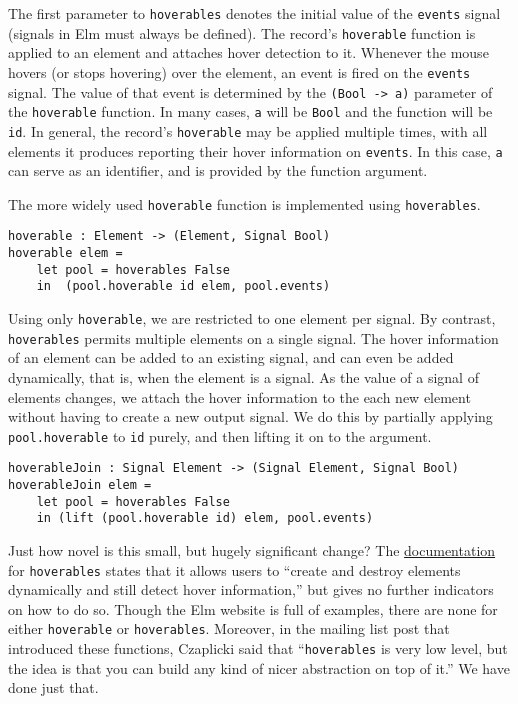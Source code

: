 \documentclass{article}
\begin{document}
The first parameter to \texttt{hoverables} denotes the initial value of the
\texttt{events} signal (signals in Elm must always be defined). The record's
\texttt{hoverable} function is applied to an element and attaches hover
detection to it. Whenever the mouse hovers (or stops hovering) over the element,
an event is fired on the \texttt{events} signal. The value of that event is
determined by the \texttt{(Bool -> a)} parameter of the \texttt{hoverable}
function. In many cases, \texttt{a} will be \texttt{Bool} and the function will
be \texttt{id}. In general, the record's \texttt{hoverable} may be applied
multiple times, with all elements it produces reporting their hover information
on \texttt{events}. In this case, \texttt{a} can serve as an identifier, and is
provided by the function argument.

The more widely used \texttt{hoverable} function is implemented using
\texttt{hoverables}.

\begin{verbatim}
hoverable : Element -> (Element, Signal Bool)
hoverable elem =
    let pool = hoverables False
    in  (pool.hoverable id elem, pool.events)
\end{verbatim}

Using only \texttt{hoverable}, we are restricted to one element per signal. By
contrast, \texttt{hoverables} permits multiple elements on a single signal. The
hover information of an element can be added to an existing signal, and can even
be added dynamically, that is, when the element is a signal. As the value of a
signal of elements changes, we attach the hover information to the each new
element without having to create a new output signal. We do this by partially
applying \texttt{pool.hoverable} to \texttt{id} purely, and then lifting it on
to the argument.

\begin{verbatim}
hoverableJoin : Signal Element -> (Signal Element, Signal Bool)
hoverableJoin elem =
    let pool = hoverables False
    in (lift (pool.hoverable id) elem, pool.events)
\end{verbatim}

Just how novel is this small, but hugely significant change? The
\href{http://docs.elm-lang.org/library/Graphics/Input.elm\#hoverables}{documentation}
for \texttt{hoverables} states that it allows users to ``create and destroy
elements dynamically and still detect hover information,'' but gives no further
indicators on how to do so. Though the Elm website is full of examples, there
are none for either \texttt{hoverable} or \texttt{hoverables}. Moreover, in the
mailing list post that introduced these functions, Czaplicki said that
``\texttt{hoverables} is very low level, but the idea is that you can build any
kind of nicer abstraction on top of it.'' \cite{hover-forum} We have done just
that.
\end{document}
